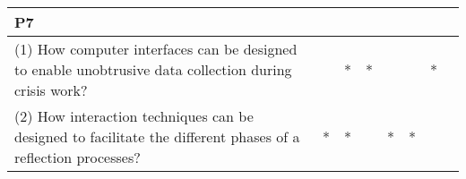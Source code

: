 \begin{longtable}[c]{@{}lccccccc@{}}
\begin{minipage}[b]{0.05\columnwidth}\centering\strut
P7
\strut\end{minipage}\tabularnewline
\midrule
\endhead
\begin{minipage}[t]{0.37\columnwidth}\raggedright\strut
(1) How computer interfaces can be designed to enable unobtrusive data
collection during crisis work?
\strut\end{minipage} &
\begin{minipage}[t]{0.05\columnwidth}\centering\strut
\strut\end{minipage} &
\begin{minipage}[t]{0.05\columnwidth}\centering\strut
*
\strut\end{minipage} &
\begin{minipage}[t]{0.05\columnwidth}\centering\strut
*
\strut\end{minipage} &
\begin{minipage}[t]{0.05\columnwidth}\centering\strut
\strut\end{minipage} &
\begin{minipage}[t]{0.05\columnwidth}\centering\strut
\strut\end{minipage} &
\begin{minipage}[t]{0.05\columnwidth}\centering\strut
*
\strut\end{minipage} &
\begin{minipage}[t]{0.05\columnwidth}\centering\strut
\strut\end{minipage}\tabularnewline
\begin{minipage}[t]{0.37\columnwidth}\raggedright\strut
(2) How interaction techniques can be designed to facilitate the
different phases of a reflection processes?
\strut\end{minipage} &
\begin{minipage}[t]{0.05\columnwidth}\centering\strut
*
\strut\end{minipage} &
\begin{minipage}[t]{0.05\columnwidth}\centering\strut
*
\strut\end{minipage} &
\begin{minipage}[t]{0.05\columnwidth}\centering\strut
\strut\end{minipage} &
\begin{minipage}[t]{0.05\columnwidth}\centering\strut
*
\strut\end{minipage} &
\begin{minipage}[t]{0.05\columnwidth}\centering\strut
*
\strut\end{minipage} &

\end{longtable}

